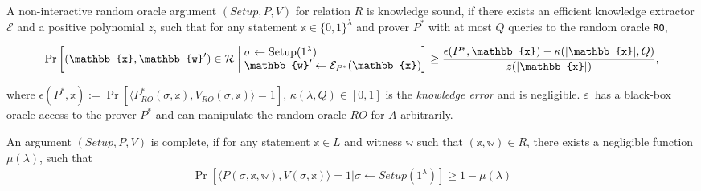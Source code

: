 \begin{definition}
    A non-interactive random oracle argument $(Setup, P, V)$ for relation $R$ is knowledge sound, if there exists an efficient knowledge extractor $\mathcal{E}$ and a positive polynomial $z$, such that for any statement $\mathbb{x}\in\{0,1\}^\lambda$ and prover $P^*$ with at most $Q$ queries to the random oracle \texttt{RO},


    \begin{align*}
        \Pr \left[ (\mathbb{x},\mathbb{w}') \in \mathcal{R} \;\middle|\;
        \begin{array}{@{}l@{}} %
            \sigma \leftarrow \text{Setup}(1^\lambda) \\
            \mathbb{w}' \leftarrow \mathcal{E}_{P^*}(\mathbb{x})
        \end{array}
        \right]
        \geq \frac{\epsilon(P^*, \mathbb{x}) - \kappa(|\mathbb{x}|, Q)}{z(|\mathbb{x}|)},
    \end{align*}
\end{definition}
where $\epsilon(P^*,\mathbb{x}):= \Pr[\langle P^*_{RO}(\sigma,\mathbb{x}),V_{RO}(\sigma,\mathbb{x}) \rangle=1]$, $\kappa(\lambda,Q)\in[0,1]$ is the \textit{knowledge error} and is negligible.
$\varepsilon$~has a black-box oracle access to the prover $P^*$ and can manipulate the random oracle $RO$ for $A$ arbitrarily.

\begin{definition}[Completeness]
    An argument $(Setup, P, V)$ is complete, if for any statement $\mathbb{x}\in L$ and witness $\mathbb{w}$ such that $(\mathbb{x,w})\in R$, there exists a negligible function $\mu(\lambda)$, such that
    \begin{align*}
        \Pr\left[\langle P(\sigma,\mathbb{x},\mathbb{w}), V(\sigma,\mathbb{x})\rangle=1|\sigma\gets Setup(1^\lambda)\right]\geq 1-\mu(\lambda)
    \end{align*}
\end{definition}

